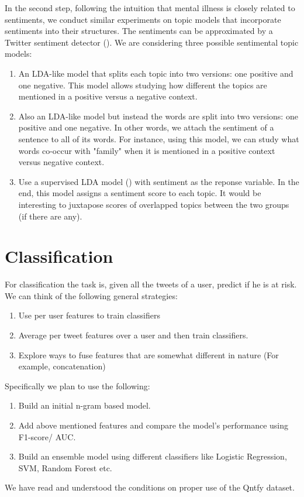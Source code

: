 \documentclass[10pt]{article}
\begin{document}
In the second step, following the intuition that mental illness is closely related to sentiments, we conduct similar experiments on topic models that incorporate sentiments into their structures. The sentiments can be approximated by a Twitter sentiment detector (\cite{go2009twitter}). We are considering three possible sentimental topic models:
\begin{enumerate}
\item An LDA-like model that splits each topic into two versions: one positive and one negative. This model allows studying how different the topics are mentioned in a positive versus a negative context.
\item Also an LDA-like model but instead the words are split into two versions: one positive and one negative. In other words, we attach the sentiment of a sentence to all of its words. For instance, using this model, we can study what words co-occur with "family" when it is mentioned in a positive context versus negative context.
\item Use a supervised LDA model (\cite{mcauliffe2008supervised}) with sentiment as the reponse variable. In the end, this model assigns a sentiment score to each topic. It would be interesting to juxtapose scores of overlapped topics between the two groups (if there are any).
\end{enumerate}

\section{Classification}
For classification the task is, given all the tweets of a user, predict if he is at risk. We can think of the following general strategies:
\begin{enumerate}
\item Use per user features to train classifiers
\item Average per tweet features over a user and then train classifiers.
\item Explore ways to fuse features that are somewhat different in nature (For example, concatenation)
\end{enumerate}

Specifically we plan to use the following:
\begin{enumerate}
\item Build an initial n-gram based model.
\item Add above mentioned features and compare the model's performance using F1-score/ AUC. 
\item Build an ensemble model using different classifiers like Logistic Regression, SVM, Random Forest etc.
\end{enumerate}



{\small


}



We have read and understood the conditions on proper use of the Qntfy dataset.
\end{document}
